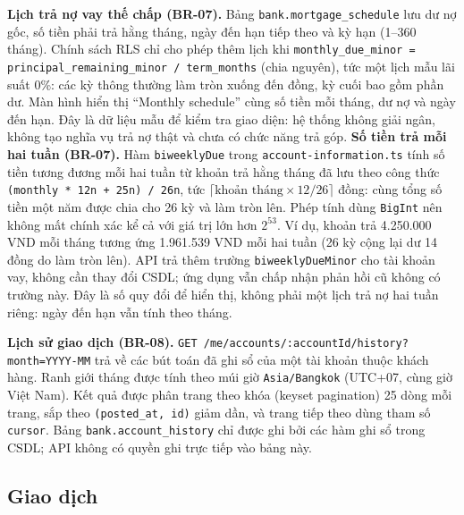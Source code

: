 \textbf{Lịch trả nợ vay thế chấp (BR-07).} Bảng \texttt{bank.\allowbreak{}mortgage\_\allowbreak{}schedule} lưu dư nợ gốc, số tiền phải trả hằng tháng, ngày đến hạn tiếp theo và kỳ hạn (1--360 tháng). Chính sách RLS chỉ cho phép thêm lịch khi \texttt{monthly\_\allowbreak{}due\_\allowbreak{}minor = principal\_\allowbreak{}remaining\_\allowbreak{}minor / term\_\allowbreak{}months} (chia nguyên), tức một lịch mẫu lãi suất 0\%: các kỳ thông thường làm tròn xuống đến đồng, kỳ cuối bao gồm phần dư. Màn hình hiển thị ``Monthly schedule'' cùng số tiền mỗi tháng, dư nợ và ngày đến hạn. Đây là dữ liệu mẫu để kiểm tra giao diện: hệ thống không giải ngân, không tạo nghĩa vụ trả nợ thật và chưa có chức năng trả góp.
\textbf{Số tiền trả mỗi hai tuần (BR-07).} Hàm \texttt{biweeklyDue} trong \texttt{account-\allowbreak{}information.\allowbreak{}ts} tính số tiền tương đương mỗi hai tuần từ khoản trả hằng tháng đã lưu theo công thức \texttt{(monthly * 12n + 25n) / 26n}, tức $\lceil \text{khoản tháng} \times 12/26 \rceil$ đồng: cùng tổng số tiền một năm được chia cho 26 kỳ và làm tròn lên. Phép tính dùng \texttt{BigInt} nên không mất chính xác kể cả với giá trị lớn hơn $2^{53}$. Ví dụ, khoản trả 4.250.000 VND mỗi tháng tương ứng 1.961.539 VND mỗi hai tuần (26 kỳ cộng lại dư 14 đồng do làm tròn lên). API trả thêm trường \texttt{biweeklyDueMinor} cho tài khoản vay, không cần thay đổi CSDL; ứng dụng vẫn chấp nhận phản hồi cũ không có trường này. Đây là số quy đổi để hiển thị, không phải một lịch trả nợ hai tuần riêng: ngày đến hạn vẫn tính theo tháng.

\textbf{Lịch sử giao dịch (BR-08).} \texttt{GET /\allowbreak{}me/\allowbreak{}accounts/\allowbreak{}:accountId/\allowbreak{}history?month=YYYY-\allowbreak{}MM} trả về các bút toán đã ghi sổ của một tài khoản thuộc khách hàng. Ranh giới tháng được tính theo múi giờ \texttt{Asia/\allowbreak{}Bangkok} (UTC+07, cùng giờ Việt Nam). Kết quả được phân trang theo khóa (keyset pagination) 25 dòng mỗi trang, sắp theo \texttt{(posted\_\allowbreak{}at, id)} giảm dần, và trang tiếp theo dùng tham số \texttt{cursor}. Bảng \texttt{bank.\allowbreak{}account\_\allowbreak{}history} chỉ được ghi bởi các hàm ghi sổ trong CSDL; API không có quyền ghi trực tiếp vào bảng này.

\subsection{Giao dịch}
\label{sec:ch3-transactions}

